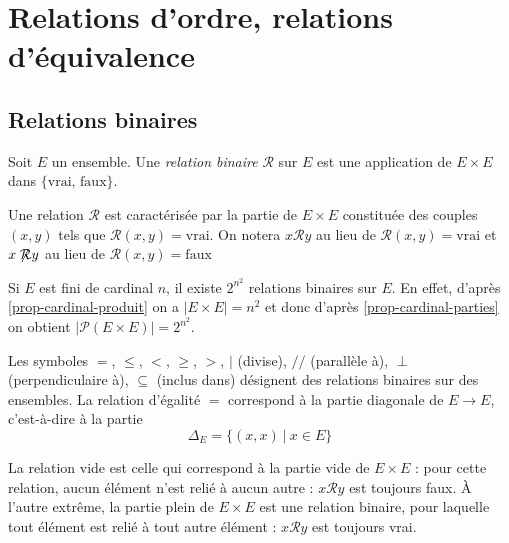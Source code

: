 \chapter{Relations d'ordre, relations d'équivalence}
\minitoc
\hyperlink{toc}{\retourTOC}

\section{Relations binaires}

\begin{definition} Soit $E$ un ensemble. Une \emph{relation binaire} ${\mathcal R}$ sur $E$ est une application de $E\times E$ dans $\{\text{vrai, faux}\}$.
\end{definition}

Une relation ${\mathcal R}$ est caractérisée par la partie de $E\times E$ constituée des couples $(x,y)$ tels que ${\mathcal R}(x,y)=\text{vrai}$. On notera \og$x{\mathcal R}y$\fg{} au lieu de \og${\mathcal R}(x,y)=\text{vrai}$\fg{} et \og$x\not \hspace{-.1cm}{\mathcal R} y$\fg{} au lieu de \og${\mathcal R}(x,y)=\text{faux}$\fg{}

\begin{exemple}
Si $E$ est fini de cardinal $n$, il existe $2^{n^2}$ relations binaires sur $E$. En effet, d'après \ref{prop-cardinal-produit} on a $|E\times E|=n^2$ et donc d'après \ref{prop-cardinal-parties} on obtient $\left|\mathcal P(E\times E)\right|=2^{n^2}$.
\end{exemple} 

\begin{exemples} Les symboles $=$, $\leq$, $<$, $\geq$, $>$, $|$ (divise), $//$ (parallèle à), $\perp$ (perpendiculaire à), $\subseteq$ (inclus dans) désignent des relations binaires sur des ensembles. La relation d'égalité $=$ correspond à la partie diagonale de $E\to E$, c'est-à-dire à la partie 
\[ \Delta_E = \{(x,x)\:|\: x\in E\}\]
\end{exemples}

\begin{exemple}[Zérologie] La relation vide est celle qui correspond à la partie vide de $E\times E$ : pour cette relation, aucun élément n'est relié à aucun autre : $x\mathcal R y$ est toujours faux. À l'autre extrême, la partie plein de $E\times E$ est une relation binaire, pour laquelle tout élément est relié à tout autre élément : $x\mathcal R y$ est toujours vrai. 
\end{exemple}

